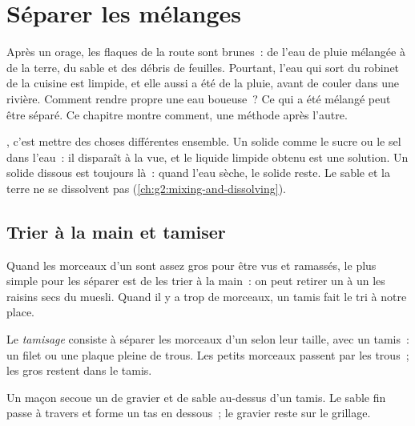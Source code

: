 \chapter{Séparer les mélanges}\label{ch:g3:separating-mixtures}

Après un orage, les flaques de la route sont brunes~: de l'eau de pluie
mélangée à de la terre, du sable et des débris de feuilles. Pourtant,
l'eau qui sort du robinet de la cuisine est limpide, et elle aussi a été
de la pluie, avant de couler dans une rivière. Comment rendre propre une
eau boueuse~? Ce qui a été mélangé peut être séparé. Ce chapitre montre
comment, une méthode après l'autre.

\begin{recall}
, c'est mettre des choses différentes ensemble. Un solide comme
le sucre ou le sel  dans l'eau~: il disparaît à la vue, et le
liquide limpide obtenu est une solution. Un solide dissous est toujours
là~: quand l'eau sèche, le solide reste. Le sable et la terre ne se
dissolvent pas (\cref{ch:g2:mixing-and-dissolving}).
\end{recall}

\section{Trier à la main et tamiser}

Quand les morceaux d'un  sont assez gros pour être vus et
ramassés, le plus simple pour les séparer est de les trier à la main~:
on peut retirer un à un les raisins secs du muesli. Quand il y a trop de
morceaux, un tamis fait le tri à notre place.

\begin{definition}[Tamisage]\label{def:g3:separating-mixtures:sieve}
Le \emph{tamisage} consiste à séparer les morceaux d'un
 selon leur taille, avec un tamis~: un filet ou une plaque pleine
de trous. Les petits morceaux passent par les trous~; les gros restent
dans le tamis.
\end{definition}

\begin{example}\label{ex:g3:separating-mixtures:gravel}
Un maçon secoue un  de gravier et de sable au-dessus d'un tamis.
Le sable fin passe à travers et forme un tas en dessous~; le gravier
reste sur le grillage.
\end{example}

